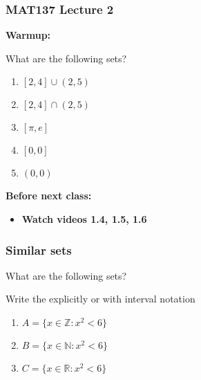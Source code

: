 \documentclass[14pt]{beamer}
\date{}
\title{}
\author{}
\newcommand {\DS} [1] {${\displaystyle #1}$}
\newcommand {\R}{\mathbb{R}}
\newcommand {\Z}{\mathbb{Z}}
\newcommand {\N}{\mathbb{N}}
\begin{document}



\begin{frame}
\frametitle{MAT137 Lecture 2}

\textbf{Warmup:}
\vfill

What are the following sets?

\begin{enumerate} 
	\item  $[2,4] \cup (2,5)$
	\item  $[2,4] \cap (2,5)$
	\item  $[\pi,e]$
	\item  $[0,0]$
	\item  $(0,0)$
\end{enumerate}

	\vfill
	{\bf Before next class:}
		\begin{itemize} \normalsize
			\item {\bf Watch videos 1.4, 1.5, 1.6 }
		\end{itemize}
	\vfill
\end{frame}




\begin{frame}
\frametitle{Similar sets}

What are the following sets? 

	{\small Write the explicitly or with interval notation}

	\bigskip
	\begin{enumerate} 
		\item  \DS{A = \{ x \in \Z : x^2 < 6\} }
		\item  \DS{B = \{ x \in \N : x^2 < 6\} }
		\item  \DS{C = \{ x \in \R : x^2 < 6\} }
	\end{enumerate}
\end{frame}

\end{document}
